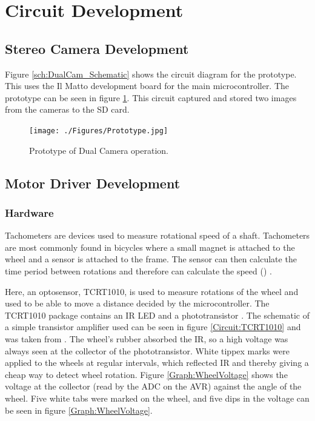 \section{Circuit Development}
\subsection{Stereo Camera Development}
Figure \ref{sch:DualCam_Schematic} shows the circuit diagram for the prototype. This uses the Il Matto development board for the main microcontroller. The prototype can be seen in figure \ref{fig:Prototype}. This circuit captured and stored two images from the cameras to the SD card. 
\begin{figure}
\texttt{[image: ./Figures/Prototype.jpg]}
\caption{Prototype of Dual Camera operation.}
\label{fig:Prototype}
\end{figure}
\subsection{Motor Driver Development}
\subsubsection{Hardware}
Tachometers are devices used to measure rotational speed of a shaft. Tachometers are most commonly found in bicycles where a small magnet is attached to the wheel and a sensor is attached to the frame. The sensor can then calculate the time period between rotations and therefore can calculate the speed (\citep{NEEDED}) .

Here, an optosensor, TCRT1010, is used to measure rotations of the wheel and used to be able to move a distance decided by the microcontroller. The TCRT1010 package contains an IR LED and a phototransistor \citep{Vishay:TCRT1010:Datasheet}. The schematic of a simple transistor amplifier used can be seen in figure \ref{Circuit:TCRT1010} and was taken from \cite{NEEDED}. 
The wheel's rubber absorbed the IR, so a high voltage was always seen at the collector of the phototransistor. White tippex marks were applied to the wheels at regular intervals, which reflected IR and thereby giving a cheap way to detect wheel rotation. Figure \ref{Graph:WheelVoltage} shows the voltage at the collector (read by the ADC on the AVR) against the angle of the wheel. Five white tabs were marked on the wheel, and five dips in the voltage can be seen in figure \ref{Graph:WheelVoltage}. 

